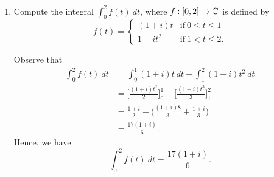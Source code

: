 \documentclass[a4paper]{article}
\begin{document}
\begin{enumerate}
\begin{enumerate}
\begin{proof}
                By definition of the complex integral, we see that 
                \[  \int_{ a }^{ b } f(t) \ dt = \int_{ a }^{ b } x(t) \ dt + i \int_{ a }^{ b }  y(t) \ dt. \]
                Since \( x(t) \) and \( y(t)  \) are real-integrable functions for all \( t \in [a,b] \), we see that 
                \[  -\int_{ a }^{ b } x(s) \ ds = \int_{ a }^{ b } x(t) \ dt  \ \ \text{and} \ \ - \int_{ a }^{ b } y(s) \ ds = \int_{ a }^{ b } y(t) \ dt.  \]
                Starting with the right-hand side of (*), we get
                \begin{align*}
                    - \int_{ a }^{ b } f(s) \ ds &= - \Big[ \int_{ a }^{ b } x(s)  \ ds + i \int_{ a }^{ b }  y(s) \ ds \Big] \\
                                                 &= - \int_{ a }^{ b }  x(s) \ ds + i \Big(  - \int_{ a }^{ b } y(s) \ ds \Big) \\
                                                 &= \int_{ a }^{ b } x(t) \ dt + i \int_{ a }^{ b } y(t) \ dt \\
                                                 &= \int_{ a }^{ b } f(t) \ dt.
                \end{align*}
               Thus, we have established (*).
                \end{proof}
        \end{enumerate}
    \item Compute the integral \( \displaystyle \int_{ 0 }^{ 2 } f(t) \ dt \), where \( f: [0,2] \to \mathbb{C}  \) is defined by 
        \[  f(t) = 
        \begin{cases}
            (1+i)t  &\text{if} \ 0 \leq t \leq 1 \\
            1 + i t^{2} &\text{if} \ 1 < t \leq 2. 
        \end{cases} \]
        \begin{solution}
        Observe that 
        \begin{align*}
            \int_{ 0 }^{ 2 } f(t) \ dt &= \int_{ 0 }^{ 1 }  (1+i)t \ dt + \int_{ 1 }^{ 2 }  (1+i) t^{2} \ dt \\
                                       &= \Big[ \frac{ (1+i)t^{2} }{ 2 } \Big]_{0}^{1} + \Big[ \frac{ (1+i)t^{3} }{ 3 } \Big]^{2}_{1} \\
                                       &= \frac{ 1+i }{ 2 }  + \Big(  \frac{ (1+i) 8  }{ 3 }  + \frac{ 1 + i  }{ 3 }  \Big) \\
                                       &= \frac{ 17 (1+i) }{ 6 }.
        \end{align*}
        Hence, we have
        \[  \int_{ 0 }^{ 2 }  f(t) \ dt = \frac{ 17 (1 + i) }{ 6 }. \]
        \end{solution}
\end{enumerate}
\end{document}
